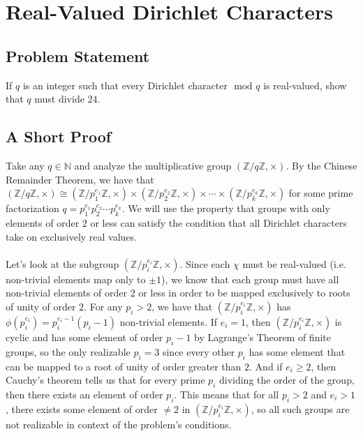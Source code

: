 \section{Real-Valued Dirichlet Characters}
\subsection{Problem Statement}
If $q$ is an integer such that every Dirichlet character $\text{ mod }q$ is real-valued, show that $q$ must divide $24$.
\subsection{A Short Proof}
Take any $q \in \mathbb{N}$ and analyze the multiplicative group $\left(\mathbb{Z}/q\mathbb{Z}, \times\right)$. By the Chinese Remainder Theorem, we have that $\left(\mathbb{Z}/q\mathbb{Z}, \times\right) \cong \left(\mathbb{Z}/p_1^{e_1}\mathbb{Z}, \times\right) \times \left(\mathbb{Z}/p_2^{e_2}\mathbb{Z}, \times\right) \times \cdots \times \left(\mathbb{Z}/p_k^{e_k}\mathbb{Z}, \times\right)$ for some prime factorization $q = p_1^{e_1}p_2^{e_2}\cdots p_k^{e_k}$. We will use the property that groups with only elements of order $2$ or less can satisfy the condition that all Dirichlet characters take on exclusively real values.\\
\\
Let's look at the subgroup $\left(\mathbb{Z}/p_i^{e_i}\mathbb{Z}, \times\right)$. Since each $\chi$ must be real-valued (i.e. non-trivial elements map only to $\pm 1$), we know that each group must have all non-trivial elements of order $2$ or less in order to be mapped exclusively to roots of unity of order $2$.
For any $p_i > 2$, we have that $\left(\mathbb{Z}/p_i^{e_i}\mathbb{Z}, \times\right)$ has $\phi(p_i^{e_i}) = p_i^{e_i-1}(p_i-1)$ non-trivial elements. 
If $e_i = 1$, then $\left(\mathbb{Z}/p_i^{e_i}\mathbb{Z}, \times\right)$ is cyclic and has some element of order $p_i-1$ by Lagrange's Theorem of finite groups, so the only realizable $p_i = 3$ since every other $p_i$ has some element that can be mapped to a root of unity of order greater than $2$. And if $e_i \geq 2$, then Cauchy's theorem tells us that for every prime $p_i$ dividing the order of the group, then there exists an element of order $p_i$. 
This means that for all $p_i > 2$ and $e_i > 1$, there exists some element of order $\neq 2$ in $\left(\mathbb{Z}/p_i^{e_i}\mathbb{Z}, \times\right)$, so all such groups are not realizable in context of the problem's conditions.\\
